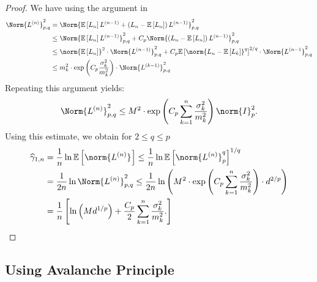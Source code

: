 \begin{proof}
  We have using the argument in \cite{huang2020matrix}
    \begin{align*}
      \Norm{L^{(n)}}_{p,q}^{2} &= \Norm{\mathbb{E}\left[L_n\right]L^{(n-1)}+ \left(L_n-\mathbb{E}\left[L_n\right]\right)L^{(n-1)}}_{p,q}^{2} \\
        &\leq \Norm{\mathbb{E}\left[L_n\right] L^{(n-1)}}_{p,q}^{2}+C_p \Norm{\left(L_n-\mathbb{E}\left[L_n\right]\right)L^{(n-1)}}_{p,q}^{2} \\
        &\leq \norm{\mathbb{E}\left[L_n\right]}_{}^{2} \cdot \Norm{L^{(n-1)}}_{p,q}^{2} + C_p \mathbb{E}\left[\norm{L_n- \mathbb{E}\left[L_k\right]}_{}^{q}\right]^{2/q} \cdot \Norm{L^{(n-1}}_{p,q}^{2} \\
        &\leq m_k^{2} \cdot \operatorname{exp}\left(C_p \frac{\sigma_k^{2}}{m_k^{2}}\right) \cdot \Norm{L^{(k-1)}}_{p,q}^{2}
    \end{align*}
    Repeating this argument yields:
    \[ \Norm{L^{(n)}}_{p,q}^{2} \leq M^{2} \cdot \operatorname{exp}\left(C_p \sum_{k=1}^{n}\frac{\sigma_k^{2}}{m_k^{2}}\right) \norm{I}_{p}^{2}. \]
    Using this estimate, we obtain for \( 2 \leq q \leq p \)
    \begin{align*}
      \widehat{\gamma}_{1,n} &= \frac{1}{n} \operatorname{ln} \mathbb{E}\left[\norm{L^{(n)}}_{} \right] \leq \frac{1}{n} \operatorname{ln} \mathbb{E}\left[ \norm{L^{(n)}}_{p}^{q}\right]^{1/q} \\
                             &= \frac{1}{2n} \operatorname{ln} \Norm{L^{(n)}}_{p,q}^{2} \leq \frac{1}{2n} \operatorname{ln}\left(M^{2} \cdot \operatorname{exp}\left(C_p \sum_{k=1}^{n} \frac{\sigma_k^{2}}{m_k^{2}}\right) \cdot d^{2/p}\right) \\
                             &= \frac{1}{n} \left[ \operatorname{ln}\left(Md^{1/p}\right) + \frac{C_p}{2} \sum_{k=1}^{n} \frac{\sigma_k^{2}}{m_k^{2}}.\right]
    \end{align*}
  \end{proof}

\subsection{Using Avalanche Principle}

\begin{defn}
    
\end{defn}


